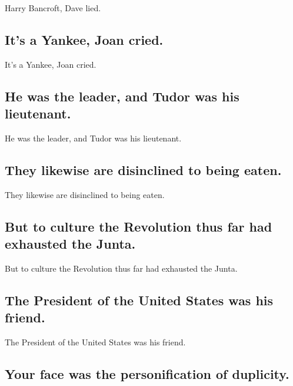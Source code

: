 \documentclass[]{article}
\begin{document}
Harry Bancroft, Dave lied.

\hypertarget{its-a-yankee-joan-cried.}{%
\subsection{It's a Yankee, Joan cried.}\label{its-a-yankee-joan-cried.}}

It's a Yankee, Joan cried.

\hypertarget{he-was-the-leader-and-tudor-was-his-lieutenant.}{%
\subsection{He was the leader, and Tudor was his
lieutenant.}\label{he-was-the-leader-and-tudor-was-his-lieutenant.}}

He was the leader, and Tudor was his lieutenant.

\hypertarget{they-likewise-are-disinclined-to-being-eaten.}{%
\subsection{They likewise are disinclined to being
eaten.}\label{they-likewise-are-disinclined-to-being-eaten.}}

They likewise are disinclined to being eaten.

\hypertarget{but-to-culture-the-revolution-thus-far-had-exhausted-the-junta.}{%
\subsection{But to culture the Revolution thus far had exhausted the
Junta.}\label{but-to-culture-the-revolution-thus-far-had-exhausted-the-junta.}}

But to culture the Revolution thus far had exhausted the Junta.

\hypertarget{the-president-of-the-united-states-was-his-friend.}{%
\subsection{The President of the United States was his
friend.}\label{the-president-of-the-united-states-was-his-friend.}}

The President of the United States was his friend.

\hypertarget{your-face-was-the-personification-of-duplicity.}{%
\subsection{Your face was the personification of
duplicity.}\label{your-face-was-the-personification-of-duplicity.}}
\end{document}
